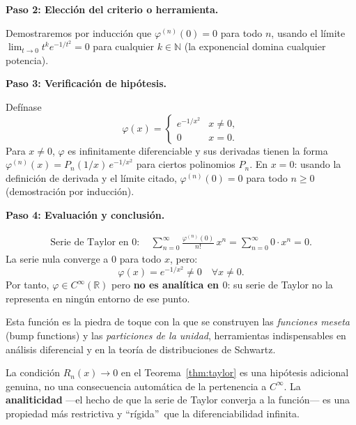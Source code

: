 \begin{example}
\begin{myproof}
\textbf{Paso 2: Elección del criterio o herramienta.}

Demostraremos por inducción que $\varphi^{(n)}(0) = 0$ para todo
$n$, usando el límite $\lim_{t\to 0} t^k e^{-1/t^2} = 0$ para
cualquier $k \in \mathbb{N}$ (la exponencial domina cualquier
potencia).

\textbf{Paso 3: Verificación de hipótesis.}

Defínase
\[
    \varphi(x) =
    \begin{cases}
        e^{-1/x^2} & x \neq 0, \\
        0           & x = 0.
    \end{cases}
\]
Para $x\neq 0$, $\varphi$ es infinitamente diferenciable y sus
derivadas tienen la forma $\varphi^{(n)}(x) = P_n(1/x)\,e^{-1/x^2}$
para ciertos polinomios $P_n$. En $x=0$: usando la definición de
derivada y el límite citado, $\varphi^{(n)}(0) = 0$ para todo
$n \geq 0$ (demostración por inducción).

\textbf{Paso 4: Evaluación y conclusión.}

\begin{align*}
    \text{Serie de Taylor en }0\colon\quad
    \sum_{n=0}^\infty \frac{\varphi^{(n)}(0)}{n!}\,x^n
    = \sum_{n=0}^\infty 0 \cdot x^n = 0.
\end{align*}
La serie nula converge a $0$ para todo $x$, pero:
\[
    \boxed{\varphi(x) = e^{-1/x^2} \neq 0 \quad \forall x \neq 0.}
\]
Por tanto, $\varphi \in C^\infty(\mathbb{R})$ pero \textbf{no es
analítica en $0$}: su serie de Taylor no la representa en ningún
entorno de ese punto.

Esta función es la piedra de toque con la que se construyen las
\emph{funciones meseta} (bump functions) y las
\emph{particiones de la unidad}, herramientas indispensables en
análisis diferencial y en la teoría de distribuciones de Schwartz.
\end{myproof}
\end{example}

\begin{rem}
La condición $R_n(x) \to 0$ en el Teorema~\ref{thm:taylor} es una
hipótesis adicional genuina, no una consecuencia automática de la
pertenencia a $C^\infty$. La \textbf{analiticidad} ---el hecho de
que la serie de Taylor converja a la función--- es una propiedad
más restrictiva y \textquotedblleft rígida\textquotedblright\ que
la diferenciabilidad infinita.
\end{rem}

